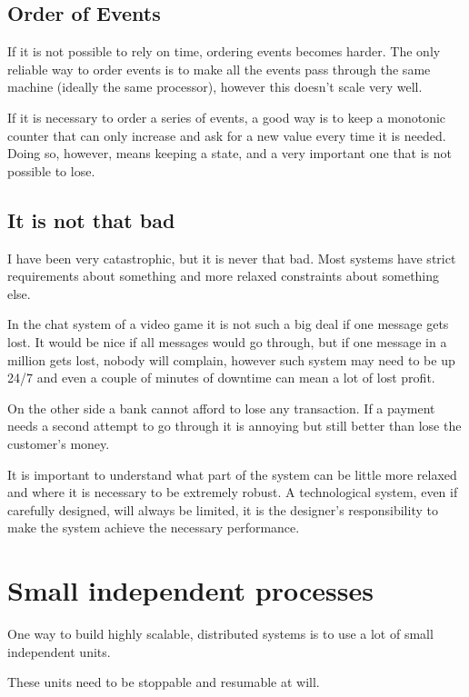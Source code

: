 \documentclass[12pt]{article} %
\begin{document}
	\subsection{Order of Events}
	
If it is not possible to rely on time, ordering events becomes harder. The only reliable way to order events is to make all the events pass through the same machine (ideally the same processor), however this doesn't scale very well.

If it is necessary to order a series of events, a good way is to keep a monotonic counter that can only increase and ask for a new value every time it is needed. Doing so, however, means keeping a state, and a very important one that is not possible to lose.

	\subsection{It is not that bad}

I have been very catastrophic, but it is never that bad. Most systems have strict requirements about something and more relaxed constraints about something else. 

In the chat system of a video game it is not such a big deal if one message gets lost. It would be nice if all messages would go through, but if one message in a million gets lost, nobody will complain, however such system may need to be up 24/7 and even a couple of minutes of downtime can mean a lot of lost profit.

On the other side a bank cannot afford to lose any transaction. If a payment needs a second attempt to go through it is annoying but still better than lose the customer's money.

It is important to understand what part of the system can be little more relaxed and where it is necessary to be extremely robust. A technological system, even if carefully designed, will always be limited, it is the designer's responsibility to make the system achieve the necessary performance.

\section{Small independent processes}

One way to build highly scalable, distributed systems is to use a lot of small independent units.

These units need to be stoppable and resumable at will.
\end{document}
